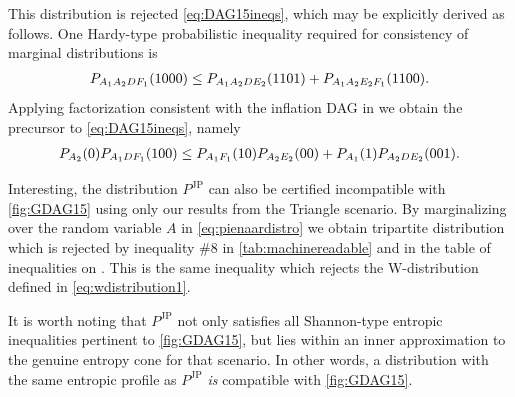 This distribution is rejected \cref{eq:DAG15ineqs}, which may be explicitly derived as follows. One Hardy-type probabilistic inequality required for consistency of marginal distributions is
\begin{align}\label{eq:hardyforpienaar}
     \pdf[A_1 A_2 D F_1]{1000} \leq \pdf[A_1 A_2 D E_2]{1101}+ \pdf[A_1 A_2 E_2 F_1]{1100}.
\end{align}
Applying factorization consistent with the inflation DAG in we obtain the precursor to \cref{eq:DAG15ineqs}, namely
\begin{align}
 \p[A_2]{0} \p[A_1 D F_1]{100} \leq \p[A_1 F_1]{10} \p[A_2 E_2]{00} + \p[A_1]{1} \p[A_2 D E_2]{001}.    
\end{align}

Interesting, the distribution $P^{\text{JP}}$ can also be certified incompatible with \cref{fig:GDAG15} using only our results from the Triangle scenario. By marginalizing over the random variable $A$ in \cref{eq:pienaardistro} we obtain tripartite distribution which is rejected by inequality $\#8$ in \cref{tab:machinereadable} and in the table of inequalities on . This is the same inequality which rejects the W-distribution defined in \cref{eq:wdistribution1}.

It is worth noting that  $P^{\text{JP}}$ not only satisfies all Shannon-type entropic inequalities pertinent to \cref{fig:GDAG15}, but lies within an inner approximation to the genuine entropy cone for that scenario\citet[private correspondence]{weilenmann2016entropic}. In other words, a distribution with the same entropic profile as  $P^{\text{JP}}$ \emph{is} compatible with \cref{fig:GDAG15}.



